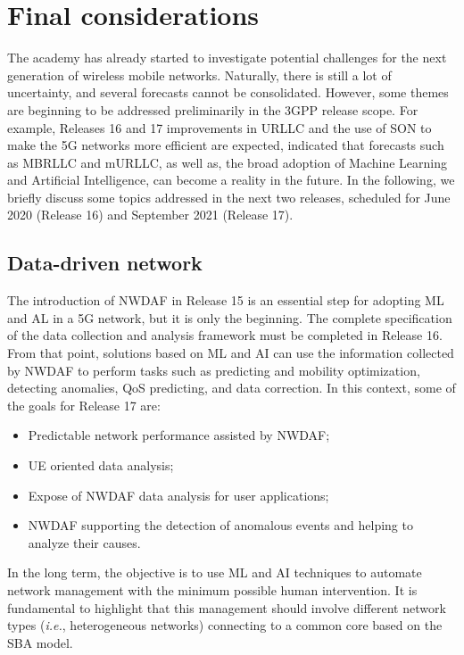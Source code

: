 \section{Final considerations}\label{sec:conclusao}

The academy has already started to investigate potential challenges for the next generation of wireless mobile networks. Naturally, there is still a lot of uncertainty, and several forecasts cannot be consolidated. However, some themes are beginning to be addressed preliminarily in the 3GPP release scope. For example, Releases 16 and 17 improvements in URLLC and the use of SON to make the 5G networks more efficient are expected, indicated that forecasts such as MBRLLC and mURLLC, as well as, the broad adoption of Machine Learning and Artificial Intelligence, can become a reality in the future. In the following, we briefly discuss some topics addressed in the next two releases, scheduled for June 2020 (Release 16) and September 2021 (Release 17).


\subsection*{Data-driven network}

The introduction of NWDAF in Release 15 is an essential step for adopting ML and AL in a 5G network, but it is only the beginning. The complete specification of the data collection and analysis framework must be completed in Release 16. From that point, solutions based on ML and AI can use the information collected by NWDAF to perform tasks such as predicting and mobility optimization, detecting anomalies, QoS predicting, and data correction. In this context, some of the goals for Release 17 are:

\begin{itemize}
    \item Predictable network performance assisted by NWDAF;
    \item UE oriented data analysis;
    \item Expose of NWDAF data analysis for user applications;
    \item NWDAF supporting the detection of anomalous events and helping to analyze their causes.
\end{itemize}

In the long term, the objective is to use ML and AI techniques to automate network management with the minimum possible human intervention. It is fundamental to highlight that this management should involve different network types (\textit{i.e.}, heterogeneous networks) connecting to a common core based on the SBA model.

